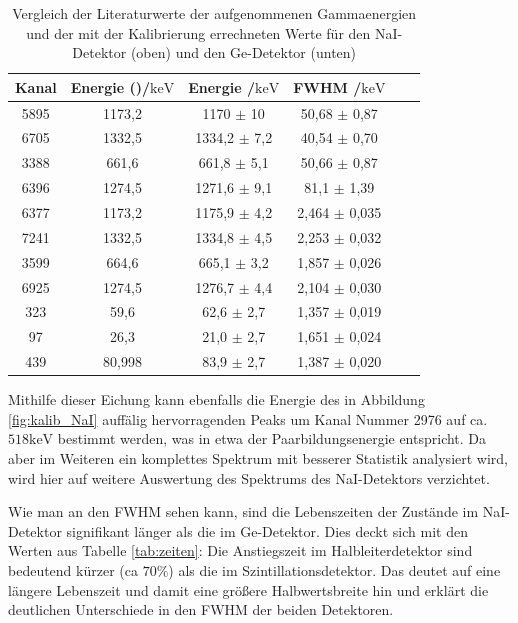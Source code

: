 \documentclass[
	parskip=half,10pt,
	numbers= noenddot, %
	toc=flat, %
	oneside,
	twocolumn,
	]{scrartcl}
\begin{document}
\begin{table}[t]
\centering
\begin{tabular}{cccccc}
Kanal & Energie (\cite{kohlrausch})/$\si{\kilo \electronvolt}$ & Energie /$\si{\kilo \electronvolt}$& FWHM /$\si{\kilo \electronvolt}$\\
\hline
5895 & 1173,2 & 1170   $\pm$ 10 & 50,68  $\pm$ 0,87\\
6705 & 1332,5 & 1334,2 $\pm$ 7,2 & 40,54 $\pm$ 0,70\\
3388 & 661,6 & 661,8   $\pm$ 5,1 & 50,66 $\pm$ 0,87\\
6396 & 1274,5 & 1271,6 $\pm$ 9,1 & 81,1  $\pm$ 1,39\\
\hline
6377 & 1173,2 & 1175,9 $\pm$ 4,2 & 2,464 $\pm$ 0,035\\
7241 & 1332,5 & 1334,8 $\pm$ 4,5 & 2,253 $\pm$ 0,032\\
3599 & 664,6 & 665,1   $\pm$ 3,2 & 1,857 $\pm$ 0,026\\
6925 & 1274,5 & 1276,7 $\pm$ 4,4 & 2,104 $\pm$ 0,030\\
323 & 59,6 & 62,6      $\pm$ 2,7 & 1,357 $\pm$ 0,019\\
97 & 26,3 & 21,0       $\pm$ 2,7 & 1,651 $\pm$ 0,024\\
439 & 80,998 & 83,9    $\pm$ 2,7 & 1,387 $\pm$ 0,020
\end{tabular}
\caption{Vergleich der Literaturwerte der aufgenommenen Gammaenergien und der mit der Kalibrierung errechneten Werte für den NaI-Detektor (oben) und den Ge-Detektor 
(unten)}
\label{tab:kalib_fertig}
\end{table}

Mithilfe dieser Eichung kann ebenfalls die Energie des in Abbildung \ref{fig:kalib_NaI} auffälig hervorragenden Peaks um Kanal Nummer 2976 auf ca. 
$518 \si{\kilo \electronvolt}$ bestimmt werden, was in etwa der Paarbildungsenergie entspricht. Da aber im Weiteren ein komplettes Spektrum mit besserer Statistik 
analysiert wird, wird hier auf weitere Auswertung des Spektrums des NaI-Detektors verzichtet. 

Wie man an den FWHM sehen kann, sind die Lebenszeiten der Zustände im NaI-Detektor signifikant länger als die im Ge-Detektor. Dies deckt sich mit den Werten aus 
Tabelle \ref{tab:zeiten}: Die Anstiegszeit im Halbleiterdetektor sind bedeutend kürzer (ca $ 70 \%$) als die im Szintillationsdetektor.  Das deutet auf eine 
längere Lebenszeit und damit eine größere Halbwertsbreite hin und erklärt die deutlichen Unterschiede in den FWHM der beiden Detektoren. 
\end{document}

